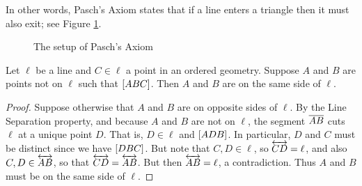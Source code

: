 In other words, Pasch's Axiom states that if a line enters a triangle then it must also exit; see Figure \ref{fig:pasch}.

\begin{figure}[h]
\begin{center}
\caption{\label{fig:pasch}The setup of Pasch's Axiom}
\end{center}
\end{figure}

\begin{lem}\label{lem:betweenness-separation}
Let \(\ell\) be a line and \(C \in \ell\) a point in an ordered geometry.
Suppose \(A\) and \(B\) are points not on \(\ell\) such that \([ A B C ]\).
Then \(A\) and \(B\) are on the same side of \(\ell\).
\end{lem}

\begin{proof}
Suppose otherwise that \(A\) and \(B\) are on opposite sides of \(\ell\).
By the Line Separation property, and because \(A\) and \(B\) are not on \(\ell\), the segment \(\overline{AB}\) cuts \(\ell\) at a unique point \(D\).
That is, \(D \in \ell\) and \([ A D B ]\).
In particular, \(D\) and \(C\) must be distinct since we have \([ D B C ]\).
But note that \(C, D \in \ell\), so \(\overleftrightarrow{CD} = \ell\), and also \(C, D \in \overleftrightarrow{AB}\), so that \(\overleftrightarrow{CD} = \overleftrightarrow{AB}\).
But then \(\overleftrightarrow{AB} = \ell\), a contradiction.
Thus \(A\) and \(B\) must be on the same side of \(\ell\).
\end{proof}

\Exercises%
